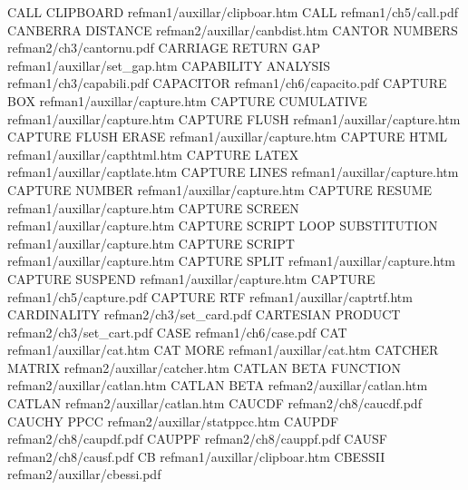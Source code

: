 CALL CLIPBOARD                          refman1/auxillar/clipboar.htm
CALL                                    refman1/ch5/call.pdf
CANBERRA DISTANCE                       refman2/auxillar/canbdist.htm
CANTOR NUMBERS                          refman2/ch3/cantornu.pdf
CARRIAGE RETURN GAP                     refman1/auxillar/set_gap.htm
CAPABILITY ANALYSIS                     refman1/ch3/capabili.pdf
CAPACITOR                               refman1/ch6/capacito.pdf
CAPTURE BOX                             refman1/auxillar/capture.htm
CAPTURE CUMULATIVE                      refman1/auxillar/capture.htm
CAPTURE FLUSH                           refman1/auxillar/capture.htm
CAPTURE FLUSH ERASE                     refman1/auxillar/capture.htm
CAPTURE HTML                            refman1/auxillar/capthtml.htm
CAPTURE LATEX                           refman1/auxillar/captlate.htm
CAPTURE LINES                           refman1/auxillar/capture.htm
CAPTURE NUMBER                          refman1/auxillar/capture.htm
CAPTURE RESUME                          refman1/auxillar/capture.htm
CAPTURE SCREEN                          refman1/auxillar/capture.htm
CAPTURE SCRIPT LOOP SUBSTITUTION        refman1/auxillar/capture.htm
CAPTURE SCRIPT                          refman1/auxillar/capture.htm
CAPTURE SPLIT                           refman1/auxillar/capture.htm
CAPTURE SUSPEND                         refman1/auxillar/capture.htm
CAPTURE                                 refman1/ch5/capture.pdf
CAPTURE RTF                             refman1/auxillar/captrtf.htm
CARDINALITY                             refman2/ch3/set_card.pdf
CARTESIAN PRODUCT                       refman2/ch3/set_cart.pdf
CASE                                    refman1/ch6/case.pdf
CAT                                     refman1/auxillar/cat.htm
CAT MORE                                refman1/auxillar/cat.htm
CATCHER MATRIX                          refman2/auxillar/catcher.htm
CATLAN BETA FUNCTION                    refman2/auxillar/catlan.htm
CATLAN BETA                             refman2/auxillar/catlan.htm
CATLAN                                  refman2/auxillar/catlan.htm
CAUCDF                                  refman2/ch8/caucdf.pdf
CAUCHY PPCC                             refman2/auxillar/statppcc.htm
CAUPDF                                  refman2/ch8/caupdf.pdf
CAUPPF                                  refman2/ch8/cauppf.pdf
CAUSF                                   refman2/ch8/causf.pdf
CB                                      refman1/auxillar/clipboar.htm
CBESSII                                 refman2/auxillar/cbessi.pdf
